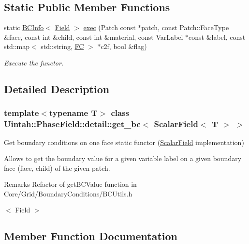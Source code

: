 \subsection*{Static Public Member Functions}
\begin{DoxyCompactItemize}
\item 
static \hyperlink{structUintah_1_1PhaseField_1_1BCInfo}{B\+C\+Info}$<$ \hyperlink{structUintah_1_1PhaseField_1_1ScalarField}{Field} $>$ \hyperlink{classUintah_1_1PhaseField_1_1detail_1_1get__bc_3_01ScalarField_3_01T_01_4_01_4_ad8220caed33e768ba378750f4b7fa9fa}{exec} (Patch const $\ast$patch, const Patch\+::\+Face\+Type \&face, const int \&child, const int \&material, const Var\+Label $\ast$const \&label, const std\+::map$<$ std\+::string, \hyperlink{namespaceUintah_1_1PhaseField_aeb51fe956fe07f1487f5878f4039f27c}{FC} $>$ $\ast$c2f, bool \&flag)
\begin{DoxyCompactList}\small\item\em Execute the functor. \end{DoxyCompactList}\end{DoxyCompactItemize}


\subsection{Detailed Description}
\subsubsection*{template$<$typename T$>$\newline
class Uintah\+::\+Phase\+Field\+::detail\+::get\+\_\+bc$<$ Scalar\+Field$<$ T $>$ $>$}

Get boundary conditions on one face static functor (\hyperlink{structUintah_1_1PhaseField_1_1ScalarField}{Scalar\+Field} implementation) 

Allows to get the boundary value for a given variable label on a given boundary face (face, child) of the given patch.

\begin{DoxyRemark}{Remarks}
Refactor of get\+B\+C\+Value function in Core/\+Grid/\+Boundary\+Conditions/\+B\+C\+Utils.\+h
\end{DoxyRemark}
$<$ Field $>$ 

\subsection{Member Function Documentation}
\mbox{\label{classUintah_1_1PhaseField_1_1detail_1_1get__bc_3_01ScalarField_3_01T_01_4_01_4_ad8220caed33e768ba378750f4b7fa9fa}} 
